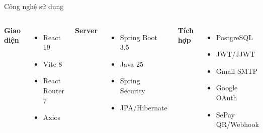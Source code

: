\documentclass[t, aspectratio=169]{beamer}
\begin{document}
\begin{frame}{Công nghệ sử dụng}
\begin{columns}[T,onlytextwidth]
\textbf{\textcolor{hustprimary}{Giao diện}}
\begin{itemize}
  \item React 19
  \item Vite 8
  \item React Router 7
  \item Axios
\end{itemize}
\textbf{\textcolor{hustprimary}{Server}}
\begin{itemize}
  \item Spring Boot 3.5
  \item Java 25
  \item Spring Security
  \item JPA/Hibernate
\end{itemize}
\textbf{\textcolor{hustprimary}{Tích hợp}}
\begin{itemize}
  \item PostgreSQL
  \item JWT/JJWT
  \item Gmail SMTP
  \item Google OAuth
  \item SePay QR/Webhook
\end{itemize}
\end{columns}
\end{frame}
\end{document}
